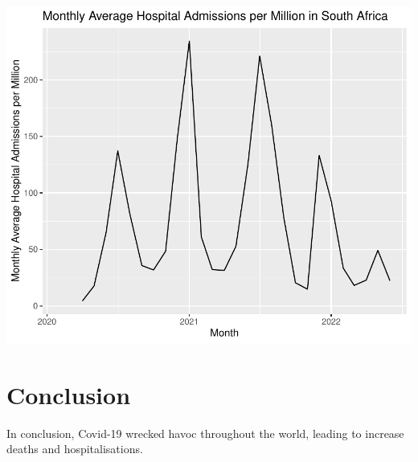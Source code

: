 \documentclass[11pt,preprint, authoryear]{elsarticle}
\numberwithin{equation}{section}
\numberwithin{figure}{section}
\numberwithin{table}{section}
\begin{document}
\includegraphics{Q1_files/figure-latex/unnamed-chunk-3-3.pdf}

\hfill

\hypertarget{conclusion}{%
\section{Conclusion}\label{conclusion}}

In conclusion, Covid-19 wrecked havoc throughout the world, leading to
increase deaths and hospitalisations.

\newpage


\end{document}
